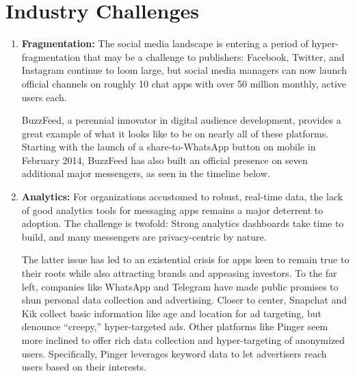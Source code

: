 \documentclass[notoc, symmetric, nobib, nols]{towcenter-guideto-book}
\begin{document}
\section{Industry Challenges}

\begin{enumerate}[itemsep=1em]
\item\textbf{Fragmentation:} The social media landscape is entering a period of hyper-fragmentation that may be a challenge to publishers: Facebook, Twitter, and Instagram continue to loom large, but social media managers can now launch official channels on roughly 10 chat apps with over 50 million monthly, active users each.  

\hspace{2ex} BuzzFeed, a perennial innovator in digital audience development, provides a great example of what it looks like to be on nearly all of these platforms. Starting with the launch of a share-to-WhatsApp button on mobile in February 2014, BuzzFeed has also built an official presence on seven additional major messengers, as seen in the timeline below.


\item\textbf{Analytics:} For organizations accustomed to robust, real-time data, the lack of good analytics tools for messaging apps remains a major deterrent to adoption. The challenge is twofold: Strong analytics dashboards take time to build, and many messengers are privacy-centric by nature.  

\hspace{2ex} The latter issue has led to an existential crisis for apps keen to remain true to their roots while also attracting brands and appeasing investors. To the far left, companies like WhatsApp and Telegram have made public promises to shun personal data collection and advertising. Closer to center, Snapchat and Kik collect basic information like age and location for ad targeting, but denounce ``creepy,'' hyper-targeted ads. Other platforms like Pinger seem more inclined to offer rich data collection and hyper-targeting of anonymized users. Specifically, Pinger leverages keyword data to let advertisers reach users based on their interests.  



\end{enumerate}
\end{document}
